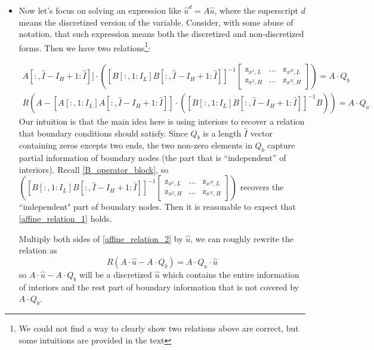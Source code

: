 \documentclass[11pt]{article}
\begin{document}
\begin{itemize}
		\item Now let's focus on solving an expression like $\hat{u}^d = A \hat{u}$, where the superscript $d$ means the discretized version of the variable. Consider, with some abuse of notation, that such expression means both the discretized and non-discretized forms. Then we have two relations\footnote{We could not find a way to clearly show two relations above are correct, but some intuitions are provided in the text}:
		
		\begin{align}
		[A[:, 1:I_L] A[:,\hat{I}-I_H+1:\hat{I}]]\cdot\left([B[:,1:I_L] B[:,\hat{I}-I_H+1:\hat{I}]]^{-1}\begin{bmatrix}
		\text{z}_{x^{1},L} & ... & \text{z}_{x^{N},L}\\
		\text{z}_{x^{2},H} & ... & \text{z}_{x^{N},H}
		\end{bmatrix}\right) = A\cdot Q_b\label{affine_relation_1}
		\end{align}
		\begin{align}
		R(A-[A[:,1:I_L] A[:,\hat{I}-I_H+1:\hat{I}]]\cdot([B[:,1:I_L] B[:,\hat{I}-I_H+1:\hat{I}]]^{-1} B)) = A\cdot Q_a\label{affine_relation_2}
		\end{align}		
Our intuition is that the main idea here is using interiors to recover a relation that boundary conditions should satisfy. Since $Q_b$ is a length $\hat{I}$ vector containing zeros excepts two ends, the two non-zero elements in $Q_b$ capture partial information of boundary nodes (the part that is ``independent'' of interiors).  Recall \eqref{B_operator_block}, so $\left([B[:,1:I_L] B[:,\hat{I}-I_H+1:\hat{I}]]^{-1}\begin{bmatrix}
		\text{z}_{x^{1},L} & ... & \text{z}_{x^{N},L}\\
		\text{z}_{x^{2},H} & ... & \text{z}_{x^{N},H}
		\end{bmatrix}\right)$ recovers the ``independent" part of boundary nodes. Then it is reasonable to expect that \eqref{affine_relation_1} holds.
		
		Multiply both sides of \eqref{affine_relation_2} by $\hat{u}$, we can roughly rewrite the relation as
		\begin{equation}
		R(A\cdot \hat{u}-A\cdot Q_b) = A\cdot Q_a\cdot \hat{u}
		\end{equation}
		so $A\cdot \hat{u}-A\cdot Q_b$ will be a discretized $\hat{u}$ which contains the entire information of interiors and the rest part of boundary information that is not covered by $A\cdot Q_b$. 
		

\end{itemize}
\end{document}
